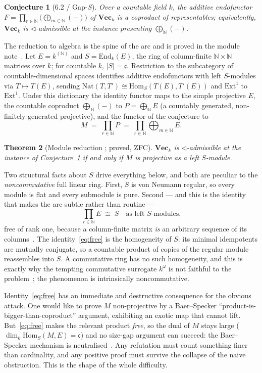 \documentclass[11pt]{report}
\theoremstyle{plain}
\newtheorem{theorem}{Theorem}[chapter]
\newtheorem{conjecture}[theorem]{Conjecture}
\theoremstyle{definition}
\theoremstyle{remark}
\newcommand{\VecC}{\mathbf{Vec}}
\newcommand{\cont}{\mathfrak{c}}
\newcommand{\End}{\mathrm{End}}
\newcommand{\Hom}{\mathrm{Hom}}
\newcommand{\Ext}{\mathrm{Ext}}
\newcommand{\Nat}{\mathrm{Nat}}
\newcommand{\tri}{\triangleleft}
\newcommand{\N}{\mathbb{N}}
\begin{document}
\begin{conjecture}[6.2 / Gap-$S$]\label{conj:frontier}
Over a countable field $k$, the additive endofunctor
$F=\prod_{r\in\N}\bigl(\bigoplus_{m\in\N}(-)\bigr)$ of $\VecC_k$ is a coproduct
of representables; equivalently, $\VecC_k$ is $\tri$-admissible at the instance
presenting $\bigoplus_\N(-)$.
\end{conjecture}

The reduction to algebra is the spine of the arc and is proved in the module
note~\cite{macbeth-reduction}. Let $E=k^{(\N)}$ and $S=\End_k(E)$, the ring of
column-finite $\N\times\N$ matrices over $k$; for countable $k$, $|S|=\cont$.
Restriction to the subcategory of countable-dimensional spaces identifies
additive endofunctors with left $S$-modules via $T\mapsto T(E)$, sending
$\Nat(T,T')\cong\Hom_S(T(E),T'(E))$ and $\Ext^1$ to $\Ext^1$. Under this
dictionary the identity functor maps to the simple projective $E$, the countable
coproduct $\bigoplus_\N(-)$ to $P=\bigoplus_\N E$ (a countably generated,
non-finitely-generated projective), and the functor of the conjecture to
\[
   M \;=\; \prod_{r\in\N} P \;=\; \prod_{r\in\N}\bigoplus_{m\in\N} E .
\]

\begin{theorem}[Module reduction {\cite[Thm.~1--2]{macbeth-reduction}}; proved, ZFC]
\label{thm:frontier-reduction}
$\VecC_k$ is $\tri$-admissible at the instance of
Conjecture~\ref{conj:frontier} if and only if $M$ is projective as a left
$S$-module.
\end{theorem}

Two structural facts about $S$ drive everything below, and both are peculiar to
the \emph{noncommutative} full linear ring. First, $S$ is von Neumann regular,
so every module is flat and every submodule is pure. Second --- and this is the
identity that makes the arc subtle rather than routine ---
\[
   \prod_{r\in\N} E \;\cong\; S \quad\text{as left $S$-modules,}
   \tag{$\ast$}\label{eq:free}
\]
free of rank one, because a column-finite matrix \emph{is} an arbitrary sequence
of its columns~\cite[Thm.~2]{macbeth-reduction}. The identity~\eqref{eq:free} is
the homogeneity of $S$: its minimal idempotents are mutually conjugate, so a
countable product of copies of the regular module reassembles into $S$. A
commutative ring has no such homogeneity, and this is exactly why the
tempting commutative surrogate $k^\omega$ is not faithful to the
problem~\cite{macbeth-shadow}; the phenomenon is intrinsically noncommutative.

Identity~\eqref{eq:free} has an immediate and destructive consequence for the
obvious attack. One would like to prove $M$ non-projective by a Baer--Specker
``product-is-bigger-than-coproduct'' argument, exhibiting an exotic map that
cannot lift. But~\eqref{eq:free} makes the relevant product \emph{free}, so the
dual of $M$ stays large ($\dim_k\Hom_S(M,E)=\cont$) and no size-gap argument can
succeed: the Baer--Specker mechanism is neutralised~\cite[Thm.~4]{macbeth-reduction}.
Any refutation must count something finer than cardinality, and any positive
proof must survive the collapse of the naive obstruction. This is the shape of
the whole difficulty.
\end{document}
